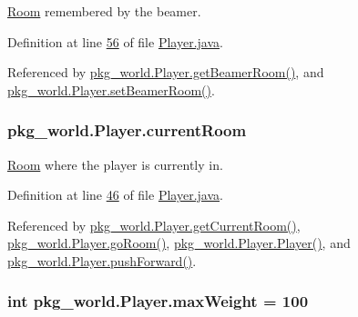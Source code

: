\hyperlink{classpkg__world_1_1Room}{Room} remembered by the beamer. 



Definition at line \hyperlink{Player_8java_source_l00056}{56} of file \hyperlink{Player_8java_source}{Player.\-java}.



Referenced by \hyperlink{Player_8java_source_l00167}{pkg\-\_\-world.\-Player.\-get\-Beamer\-Room()}, and \hyperlink{Player_8java_source_l00159}{pkg\-\_\-world.\-Player.\-set\-Beamer\-Room()}.

\hypertarget{classpkg__world_1_1Player_a2b0217339fe7077674b0e0a1ad33cc1e}{
\subsubsection[{current\-Room}]{ pkg\-\_\-world.\-Player.\-current\-Room\hspace{0.3cm}{\ttfamily [private]}}}\label{classpkg__world_1_1Player_a2b0217339fe7077674b0e0a1ad33cc1e}


\hyperlink{classpkg__world_1_1Room}{Room} where the player is currently in. 



Definition at line \hyperlink{Player_8java_source_l00046}{46} of file \hyperlink{Player_8java_source}{Player.\-java}.



Referenced by \hyperlink{Player_8java_source_l00105}{pkg\-\_\-world.\-Player.\-get\-Current\-Room()}, \hyperlink{Player_8java_source_l00113}{pkg\-\_\-world.\-Player.\-go\-Room()}, \hyperlink{Player_8java_source_l00068}{pkg\-\_\-world.\-Player.\-Player()}, and \hyperlink{Player_8java_source_l00136}{pkg\-\_\-world.\-Player.\-push\-Forward()}.

\hypertarget{classpkg__world_1_1Player_a780685c88ad92ca6b280cf841ab33728}{
\subsubsection[{max\-Weight}]{\setlength{\rightskip}{0pt plus 5cm}int pkg\-\_\-world.\-Player.\-max\-Weight = 100\hspace{0.3cm}{\ttfamily [private]}}}\label{classpkg__world_1_1Player_a780685c88ad92ca6b280cf841ab33728}



